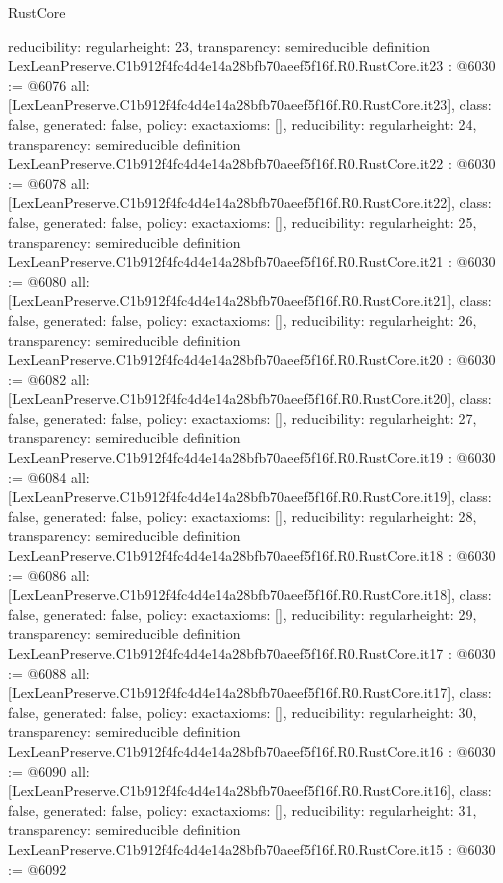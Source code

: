 \begin{lexlean}{RustCore}
\begin{coremodule}
{  reducibility: regular{height: 23},
  transparency: semireducible
}
definition LexLeanPreserve.C1b912f4fc4d4e14a28bfb70aeef5f16f.R0.RustCore.it23 : @6030 := @6076 {
  all: [LexLeanPreserve.C1b912f4fc4d4e14a28bfb70aeef5f16f.R0.RustCore.it23],
  class: false,
  generated: false,
  policy: exact{axioms: []},
  reducibility: regular{height: 24},
  transparency: semireducible
}
definition LexLeanPreserve.C1b912f4fc4d4e14a28bfb70aeef5f16f.R0.RustCore.it22 : @6030 := @6078 {
  all: [LexLeanPreserve.C1b912f4fc4d4e14a28bfb70aeef5f16f.R0.RustCore.it22],
  class: false,
  generated: false,
  policy: exact{axioms: []},
  reducibility: regular{height: 25},
  transparency: semireducible
}
definition LexLeanPreserve.C1b912f4fc4d4e14a28bfb70aeef5f16f.R0.RustCore.it21 : @6030 := @6080 {
  all: [LexLeanPreserve.C1b912f4fc4d4e14a28bfb70aeef5f16f.R0.RustCore.it21],
  class: false,
  generated: false,
  policy: exact{axioms: []},
  reducibility: regular{height: 26},
  transparency: semireducible
}
definition LexLeanPreserve.C1b912f4fc4d4e14a28bfb70aeef5f16f.R0.RustCore.it20 : @6030 := @6082 {
  all: [LexLeanPreserve.C1b912f4fc4d4e14a28bfb70aeef5f16f.R0.RustCore.it20],
  class: false,
  generated: false,
  policy: exact{axioms: []},
  reducibility: regular{height: 27},
  transparency: semireducible
}
definition LexLeanPreserve.C1b912f4fc4d4e14a28bfb70aeef5f16f.R0.RustCore.it19 : @6030 := @6084 {
  all: [LexLeanPreserve.C1b912f4fc4d4e14a28bfb70aeef5f16f.R0.RustCore.it19],
  class: false,
  generated: false,
  policy: exact{axioms: []},
  reducibility: regular{height: 28},
  transparency: semireducible
}
definition LexLeanPreserve.C1b912f4fc4d4e14a28bfb70aeef5f16f.R0.RustCore.it18 : @6030 := @6086 {
  all: [LexLeanPreserve.C1b912f4fc4d4e14a28bfb70aeef5f16f.R0.RustCore.it18],
  class: false,
  generated: false,
  policy: exact{axioms: []},
  reducibility: regular{height: 29},
  transparency: semireducible
}
definition LexLeanPreserve.C1b912f4fc4d4e14a28bfb70aeef5f16f.R0.RustCore.it17 : @6030 := @6088 {
  all: [LexLeanPreserve.C1b912f4fc4d4e14a28bfb70aeef5f16f.R0.RustCore.it17],
  class: false,
  generated: false,
  policy: exact{axioms: []},
  reducibility: regular{height: 30},
  transparency: semireducible
}
definition LexLeanPreserve.C1b912f4fc4d4e14a28bfb70aeef5f16f.R0.RustCore.it16 : @6030 := @6090 {
  all: [LexLeanPreserve.C1b912f4fc4d4e14a28bfb70aeef5f16f.R0.RustCore.it16],
  class: false,
  generated: false,
  policy: exact{axioms: []},
  reducibility: regular{height: 31},
  transparency: semireducible
}
definition LexLeanPreserve.C1b912f4fc4d4e14a28bfb70aeef5f16f.R0.RustCore.it15 : @6030 := @6092 {
}
\end{coremodule}
\end{lexlean}

